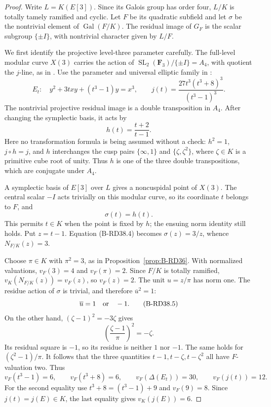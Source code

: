 \begin{proof}
Write $L=K(E[3])$. Since its Galois group has order four, $L/K$
is totally tamely ramified and cyclic. Let $F$ be its quadratic
subfield and let $\sigma$ be the nontrivial element of
$\operatorname{Gal}(F/K)$. The residual image of $G_F$ is the
scalar subgroup $\{\pm I\}$, with nontrivial character given by
$L/F$.

We first identify the projective level-three parameter carefully.
The full-level modular curve $X(3)$ carries the action of
$\operatorname{SL}_2(\mathbf F_3)/\{\pm I\}=A_4$, with quotient
the $j$-line, as in \citet[Section~2, p.~4]{Fisher2015Nine}.
Use the parameter and universal elliptic family in
\citet[Lemma~4.2(i), p.~8]{Fisher2015Nine}:
\[
 E_t:\quad y^2+3txy+(t^3-1)y=x^3,
 \qquad
 j(t)=\frac{27t^3(t^3+8)^3}{(t^3-1)^3}.
                                                        \tag{B-RD38.2}
\]
The nontrivial projective residual image is a double transposition
in $A_4$. After changing the symplectic basis, it acts by
\[
                  h(t)=\frac{t+2}{t-1}.
                                                        \tag{B-RD38.3}
\]
Here no transformation formula is being assumed without a check:
$h^2=1$, $j\circ h=j$, and $h$ interchanges the cusp pairs
$\{\infty,1\}$ and $\{\zeta,\zeta^2\}$, where $\zeta\in K$
is a primitive cube root of unity. Thus $h$ is one of the three
double transpositions, which are conjugate under $A_4$.

A symplectic basis of $E[3]$ over $L$ gives a noncuspidal point
of $X(3)$. The central scalar $-I$ acts trivially on this modular
curve, so its coordinate $t$ belongs to $F$, and
\[
                         \sigma(t)=h(t).
                                                        \tag{B-RD38.4}
\]
This permits $t\in K$ when the point is fixed by $h$; the ensuing
norm identity still holds. Put $z=t-1$. Equation (B-RD38.4)
becomes $\sigma(z)=3/z$, whence $N_{F/K}(z)=3$.

Choose $\pi\in K$ with $\pi^2=3$, as in
Proposition~\ref{prop:B-RD36}. With normalized valuations,
$v_F(3)=4$ and $v_F(\pi)=2$. Since $F/K$ is totally ramified,
$v_K(N_{F/K}(z))=v_F(z)$, so $v_F(z)=2$.
The unit $u=z/\pi$ has norm one. The residue action of
$\sigma$ is trivial, and therefore $\overline u^2=1$:
\[
                         \overline u=1\quad\hbox{or}\quad-1.
                                                        \tag{B-RD38.5}
\]
On the other hand, $(\zeta-1)^2=-3\zeta$ gives
\[
             \left(\frac{\zeta-1}{\pi}\right)^2=-\zeta.
\]
Its residual square is $-1$, so its residue is neither $1$
nor $-1$. The same holds for $(\zeta^2-1)/\pi$.
It follows that the three quantities $t-1,t-\zeta,t-\zeta^2$
all have $F$-valuation two. Thus
\[
 v_F(t^3-1)=6,\qquad v_F(t^3+8)=6,
 \qquad v_F(\Delta(E_t))=30,
 \qquad v_F(j(t))=12.                                  \tag{B-RD38.6}
\]
For the second equality use $t^3+8=(t^3-1)+9$ and $v_F(9)=8$.
Since $j(t)=j(E)\in K$, the last equality gives $v_K(j(E))=6$.


\end{proof}
